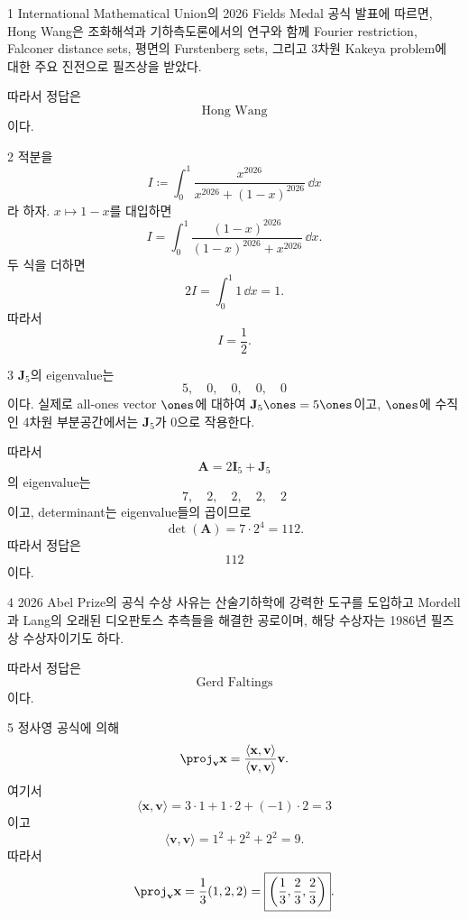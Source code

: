 \documentclass[11pt,oneside]{article}
\begin{document}

\begin{problemsolution}{1}
International Mathematical Union의 2026 Fields Medal 공식 발표에 따르면, Hong Wang은 조화해석과 기하측도론에서의 연구와 함께 Fourier restriction, Falconer distance sets, 평면의 Furstenberg sets, 그리고 3차원 Kakeya problem에 대한 주요 진전으로 필즈상을 받았다.

따라서 정답은
\[
    \boxed{\text{Hong Wang}}
\]
이다.
\end{problemsolution}

\begin{problemsolution}{2}
적분을
\[
    I\coloneqq \int_0^1
    \frac{x^{2026}}{x^{2026}+(1-x)^{2026}}
    \,\dd x
\]
라 하자. $x\mapsto1-x$를 대입하면
\[
    I=\int_0^1
    \frac{(1-x)^{2026}}{(1-x)^{2026}+x^{2026}}
    \,\dd x.
\]
두 식을 더하면
\[
    2I
    =\int_0^1 1\,\dd x
    =1.
\]
따라서
\[
    \boxed{I=\frac12}.
\]
\end{problemsolution}

\begin{problemsolution}{3}
$\mathbf{J}_5$의 eigenvalue는
\[
    5,\quad0,\quad0,\quad0,\quad0
\]
이다. 실제로 all-ones vector $\ones$에 대하여 $\mathbf{J}_5\ones=5\ones$이고, $\ones$에 수직인 4차원 부분공간에서는 $\mathbf{J}_5$가 $0$으로 작용한다.

따라서
\[
    \mathbf{A}=2\mathbf{I}_5+\mathbf{J}_5
\]
의 eigenvalue는
\[
    7,\quad2,\quad2,\quad2,\quad2
\]
이고, determinant는 eigenvalue들의 곱이므로
\[
    \det(\mathbf{A})=7\cdot2^4=112.
\]
따라서 정답은
\[
    \boxed{112}
\]
이다.
\end{problemsolution}

\begin{problemsolution}{4}
2026 Abel Prize의 공식 수상 사유는 산술기하학에 강력한 도구를 도입하고 Mordell과 Lang의 오래된 디오판토스 추측들을 해결한 공로이며, 해당 수상자는 1986년 필즈상 수상자이기도 하다.

따라서 정답은
\[
    \boxed{\text{Gerd Faltings}}
\]
이다.
\end{problemsolution}

\begin{problemsolution}{5}
정사영 공식에 의해
\[
    \proj_{\mathbf{v}}\mathbf{x}
    =
    \frac{\langle\mathbf{x},\mathbf{v}\rangle}
    {\langle\mathbf{v},\mathbf{v}\rangle}\mathbf{v}.
\]
여기서
\[
    \langle\mathbf{x},\mathbf{v}\rangle
    =3\cdot1+1\cdot2+(-1)\cdot2
    =3
\]
이고
\[
    \langle\mathbf{v},\mathbf{v}\rangle
    =1^2+2^2+2^2
    =9.
\]
따라서
\[
    \proj_{\mathbf{v}}\mathbf{x}
    =\frac13(1,2,2)
    =
    \boxed{\left(\frac13,\frac23,\frac23\right)}.
\]
\end{problemsolution}
\end{document}
